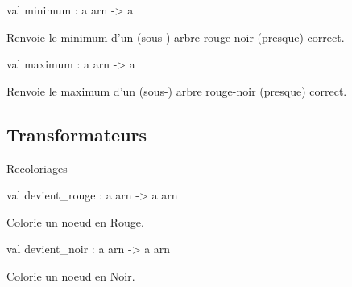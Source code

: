 \documentclass[11pt]{article}
\begin{document}
\label{val:Arn-underscoredoc.minimum}\begin{ocamldoccode}
val minimum : {\textquotesingle}a arn -> {\textquotesingle}a
\end{ocamldoccode}
\begin{ocamldocdescription}
Renvoie le minimum d'un (sous-) arbre rouge-noir
    (presque) correct.


\end{ocamldocdescription}




\label{val:Arn-underscoredoc.maximum}\begin{ocamldoccode}
val maximum : {\textquotesingle}a arn -> {\textquotesingle}a
\end{ocamldoccode}
\begin{ocamldocdescription}
Renvoie le maximum d'un (sous-) arbre rouge-noir
   (presque) correct.


\end{ocamldocdescription}




\subsection{Transformateurs}




Recoloriages



\label{val:Arn-underscoredoc.devient-underscorerouge}\begin{ocamldoccode}
val devient_rouge : {\textquotesingle}a arn -> {\textquotesingle}a arn
\end{ocamldoccode}
\begin{ocamldocdescription}
Colorie un noeud en Rouge.


\end{ocamldocdescription}




\label{val:Arn-underscoredoc.devient-underscorenoir}\begin{ocamldoccode}
val devient_noir : {\textquotesingle}a arn -> {\textquotesingle}a arn
\end{ocamldoccode}
\begin{ocamldocdescription}
Colorie un noeud en Noir.


\end{ocamldocdescription}
\end{document}
